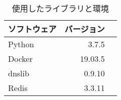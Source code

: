 \begin{table}[b]
 \caption{使用したライブラリと環境}
 \centering
  \begin{tabular}{lrr}
    \toprule
		\multicolumn{1}{c}{\textbf{ソフトウェア}} & \multicolumn{1}{c}{\textbf{バージョン}} \\
    \midrule
    Python & 3.7.5 \\
    Docker & 19.03.5 \\
    dnslib & 0.9.10 \\
    Redis & 3.3.11 \\
    \bottomrule
  \end{tabular}
 \label{tab:software_version}
\end{table}
